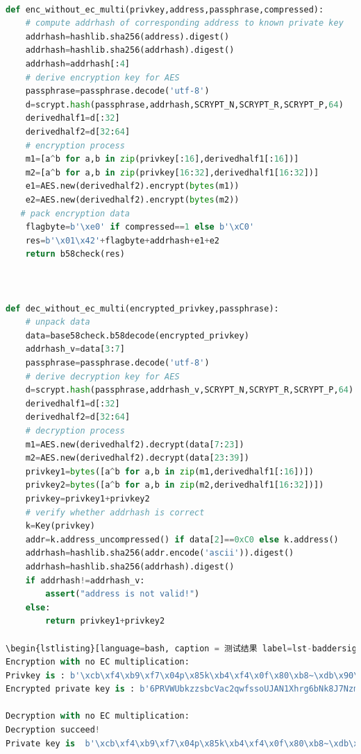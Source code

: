 \documentclass{article}
\begin{document}
\begin{lstlisting}[language=python, caption = Encryption \& Decryption with no EC multiplication label=lst-baddersig]

def enc_without_ec_multi(privkey,address,passphrase,compressed):
	# compute addrhash of corresponding address to known private key
	addrhash=hashlib.sha256(address).digest()
	addrhash=hashlib.sha256(addrhash).digest()
	addrhash=addrhash[:4]
	# derive encryption key for AES
	passphrase=passphrase.decode('utf-8')
	d=scrypt.hash(passphrase,addrhash,SCRYPT_N,SCRYPT_R,SCRYPT_P,64)
	derivedhalf1=d[:32]
	derivedhalf2=d[32:64]
	# encryption process
	m1=[a^b for a,b in zip(privkey[:16],derivedhalf1[:16])]
	m2=[a^b for a,b in zip(privkey[16:32],derivedhalf1[16:32])]
	e1=AES.new(derivedhalf2).encrypt(bytes(m1))
	e2=AES.new(derivedhalf2).encrypt(bytes(m2))
   # pack encryption data
	flagbyte=b'\xe0' if compressed==1 else b'\xC0'
	res=b'\x01\x42'+flagbyte+addrhash+e1+e2
	return b58check(res)



def dec_without_ec_multi(encrypted_privkey,passphrase):
	# unpack data 
	data=base58check.b58decode(encrypted_privkey)
	addrhash_v=data[3:7]
	passphrase=passphrase.decode('utf-8')
	# derive decryption key for AES
	d=scrypt.hash(passphrase,addrhash_v,SCRYPT_N,SCRYPT_R,SCRYPT_P,64)
	derivedhalf1=d[:32]
	derivedhalf2=d[32:64]
	# decryption process
	m1=AES.new(derivedhalf2).decrypt(data[7:23])
	m2=AES.new(derivedhalf2).decrypt(data[23:39])
	privkey1=bytes([a^b for a,b in zip(m1,derivedhalf1[:16])])
	privkey2=bytes([a^b for a,b in zip(m2,derivedhalf1[16:32])])
	privkey=privkey1+privkey2
	# verify whether addrhash is correct
	k=Key(privkey)
	addr=k.address_uncompressed() if data[2]==0xC0 else k.address()
	addrhash=hashlib.sha256(addr.encode('ascii')).digest()
	addrhash=hashlib.sha256(addrhash).digest()
	if addrhash!=addrhash_v:
		assert("address is not valid!")
	else:
		return privkey1+privkey2

\begin{lstlisting}[language=bash, caption = 测试结果 label=lst-baddersig]
Encryption with no EC multiplication:
Privkey is : b'\xcb\xf4\xb9\xf7\x04p\x85k\xb4\xf4\x0f\x80\xb8~\xdb\x90\x86Y\x97\xff\xeem\xf3\x15\xab\x16mq:\xf43\xa5'
Encrypted private key is : b'6PRVWUbkzzsbcVac2qwfssoUJAN1Xhrg6bNk8J7Nzm5H7kxEbn2Nh2ZoGg'

Decryption with no EC multiplication:
Decryption succeed!
Private key is  b'\xcb\xf4\xb9\xf7\x04p\x85k\xb4\xf4\x0f\x80\xb8~\xdb\x90\x86Y\x97\xff\xeem\xf3\x15\xab\x16mq:\xf43\xa5'
\end{lstlisting}
\end{document}
